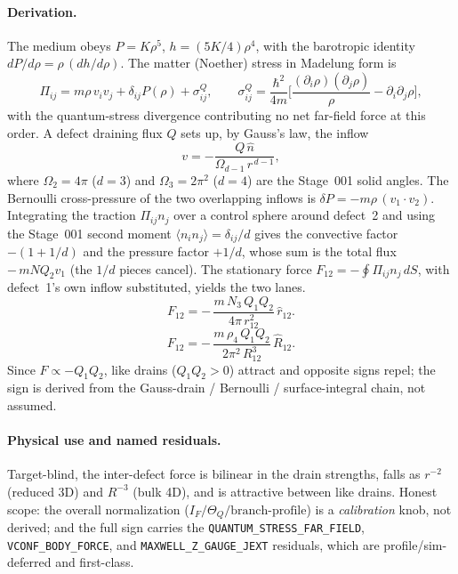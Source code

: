 \paragraph{Derivation.}
The medium obeys \(P=K\rho^5\), \(h=(5K/4)\rho^4\), with the barotropic identity
\(dP/d\rho=\rho\,(dh/d\rho)\). The matter (Noether) stress in Madelung form is
\[
  \Pi_{ij}=m\rho\,v_iv_j+\delta_{ij}P(\rho)+\sigma^{Q}_{ij},
  \qquad
  \sigma^{Q}_{ij}=\frac{\hbar^2}{4m}
  \Big[\frac{(\partial_i\rho)(\partial_j\rho)}{\rho}-\partial_i\partial_j\rho\Big],
\]
with the quantum-stress divergence contributing no net far-field force at this
order. A defect draining flux \(Q\) sets up, by Gauss's law, the inflow
\[
  v=-\frac{Q\,\hat n}{\Omega_{d-1}\,r^{\,d-1}},
\]
where \(\Omega_2=4\pi\) (\(d=3\)) and \(\Omega_3=2\pi^2\) (\(d=4\)) are the
Stage~001 solid angles. The Bernoulli cross-pressure of the two overlapping
inflows is \(\delta P=-m\rho\,(v_1\!\cdot\!v_2)\). Integrating the traction
\(\Pi_{ij}n_j\) over a control sphere around defect~2 and using the Stage~001
second moment \(\langle n_in_j\rangle=\delta_{ij}/d\) gives the convective factor
\(-(1+1/d)\) and the pressure factor \(+1/d\), whose sum is the total flux
\(-\,mN Q_2 v_1\) (the \(1/d\) pieces cancel). The stationary force
\(F_{12}=-\oint\Pi_{ij}n_j\,dS\), with defect~1's own inflow substituted, yields
the two lanes. 
\[
  F_{12}=-\,\frac{m\,N_3\,Q_1Q_2}{4\pi\,r_{12}^2}\,\hat r_{12}.
\]
\[
  F_{12}=-\,\frac{m\,\rho_4\,Q_1Q_2}{2\pi^2\,R_{12}^3}\,\hat R_{12}.
\]
 Since \(F\propto-Q_1Q_2\), like drains
(\(Q_1Q_2>0\)) attract and opposite signs repel; the sign is derived from the
Gauss-drain / Bernoulli / surface-integral chain, not assumed.

\paragraph{Physical use and named residuals.}
Target-blind, the inter-defect force is bilinear in the drain strengths, falls
as \(r^{-2}\) (reduced 3D) and \(R^{-3}\) (bulk 4D), and is attractive between
like drains. Honest scope: the overall normalization
(\(I_F/\Theta_Q/\text{branch-profile}\)) is a \emph{calibration} knob, not
derived; and the full sign carries the \texttt{QUANTUM\_STRESS\_FAR\_FIELD},
\texttt{VCONF\_BODY\_FORCE}, and \texttt{MAXWELL\_Z\_GAUGE\_JEXT} residuals,
which are profile/sim-deferred and first-class.
